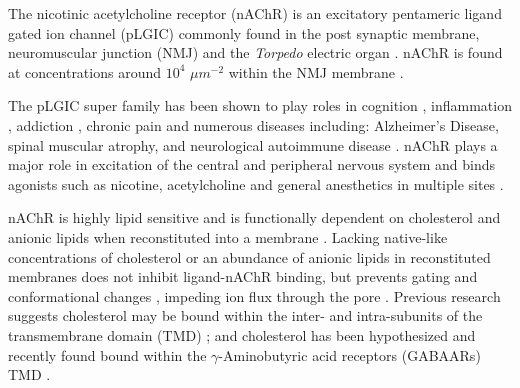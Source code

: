 The nicotinic acetylcholine receptor (nAChR) is an excitatory pentameric ligand gated ion channel (pLGIC) commonly found in the post synaptic membrane, neuromuscular junction (NMJ) \cite{Breckenridge_Adult_1973,Cotman_Lipid_1969} and the \textit{Torpedo} electric organ \cite{8DAAC844-CF26-B5A6-FE56-AEE1F681B8A3,Quesada_Uncovering_2016} . nAChR is found at concentrations around $10^4$ $\mu m^{-2}$ within the NMJ membrane \cite{Breckenrldge1972}. 

The pLGIC super family has been shown to play roles in cognition \cite{Walstab2010}, inflammation \cite{Patel2017,Yocum2017,Cornelison2016}, addiction \cite{Cornelison2016}, chronic pain \cite{Xiong2012} and numerous diseases including: Alzheimer's Disease, spinal muscular atrophy, and neurological autoimmune disease \cite{MartinRuiz_4_1999, Arnold_Reduced_2004,Lennon_Immunization_2003,Papke_The_2012,Picciotto_Neuroprotection_2008}. nAChR plays a major role in excitation of the central and peripheral nervous system and binds agonists such as nicotine, acetylcholine and general anesthetics in multiple sites \cite{Bondarenko_NMR_2013,Jayakar_Identification_2013,LeBard_General_2012,Brannigan_Multiple_2010}.

nAChR is highly lipid sensitive and is functionally dependent on cholesterol and anionic lipids when reconstituted into a membrane \cite{Fong_Correlation_1986,Sunshine_Lipid_1992,Hamouda_Assessing_2006,Butler_FTIR_1993,Bhushan_Correlation_1993,Fong_Stabilization_1987,Bednarczyk_Transmembrane_2002,Corrie_Lipid_2002}. Lacking native-like concentrations of cholesterol or an abundance of anionic lipids in reconstituted membranes does not inhibit ligand-nAChR binding, but prevents gating and conformational changes \cite{Baenziger2015,Carswell_Role_2015,Calimet2013}, impeding ion flux through the pore \cite{Fong_Correlation_1986,Sunshine_Lipid_1992,Hamouda_Assessing_2006,Butler_FTIR_1993,Bhushan_Correlation_1993,Fong_Stabilization_1987,Bednarczyk_Transmembrane_2002,Corrie_Lipid_2002,Cheng_Anionic_2009}. Previous research suggests cholesterol may be bound within the inter- and intra-subunits of the transmembrane domain (TMD) \cite{Brannigan_Embedded_2008}; and cholesterol has been hypothesized and recently found bound within the $\gamma$-Aminobutyric acid receptors (GABAARs) TMD \cite{Hnin_A_2014,Laverty2017}. 

